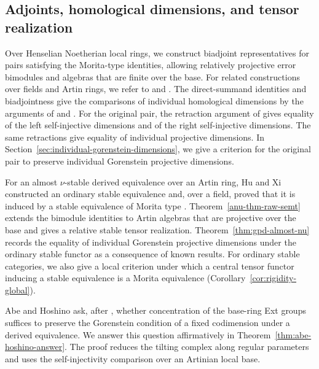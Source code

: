 \documentclass[12pt,a4paper,english,reqno]{amsart}
\numberwithin{equation}{section}
\theoremstyle{plain}
\theoremstyle{definition}
\begin{document}
\subsection{Adjoints, homological dimensions, and tensor realization}

Over Henselian Noetherian local rings, we construct biadjoint
representatives for pairs satisfying the Morita-type identities,
allowing relatively projective error bimodules and algebras that
are finite over the base. For related constructions over fields
and Artin rings, we refer to \cite[Lemma~4.1]{CPX2012} and
\cite[Lemma~3.11]{XZ2026}. The direct-summand identities and
biadjointness give the comparisons of individual homological
dimensions by the arguments of
\cite[Lemma~4.2 and Proposition~4.5]{bel-LiuXi2007} and
\cite[Theorem~3.2]{ChenRen2022}. For the original pair, the retraction
argument of \cite{bel-Tang2026} gives equality of the left
self-injective dimensions and of the right self-injective
dimensions. The same retractions give equality of individual
projective dimensions. In
Section~\ref{sec:individual-gorenstein-dimensions}, we give a
criterion for the original pair to preserve individual Gorenstein
projective dimensions.

For an almost $\nu$-stable derived equivalence over an Artin ring,
Hu and Xi constructed an ordinary stable equivalence and, over
a field, proved that it is induced by a stable equivalence of
Morita type \cite[Theorems~3.7 and~5.3]{HuXi2010}.
Theorem~\ref{anu-thm-raw-semt} extends the bimodule identities
to Artin algebras that are projective over the base and gives a
relative stable tensor realization.
Theorem~\ref{thm:gpd-almost-nu} records the equality of individual
Gorenstein projective dimensions under the ordinary stable functor
as a consequence of known results. For ordinary stable categories,
we also give a local criterion under which a central tensor functor
inducing a stable equivalence is a Morita equivalence
(Corollary~\ref{cor:rigidity-global}).

Abe and Hoshino ask, after \cite[Example~4.6]{AbeHoshino2009},
whether concentration of the base-ring Ext groups suffices to
preserve the Gorenstein condition of a fixed codimension under
a derived equivalence. We answer this question affirmatively
in Theorem~\ref{thm:abe-hoshino-answer}. The proof reduces the
tilting complex along regular parameters and uses the
self-injectivity comparison over an Artinian local base.
\end{document}
